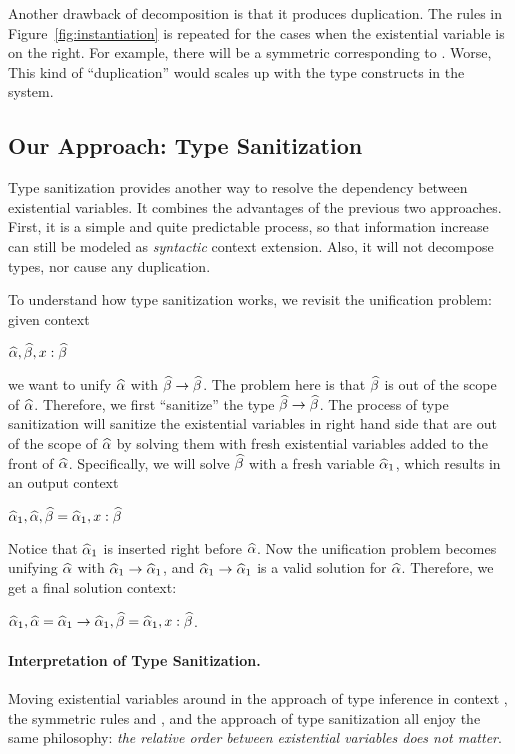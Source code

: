 Another drawback of decomposition is that it produces duplication. The rules in
Figure~\ref{fig:instantiation} is repeated for the cases when the existential
variable is on the right. For example, there will be a symmetric 
corresponding to . Worse, This kind of ``duplication'' would
scales up with the type constructs in the system.

\subsection{Our Approach: Type Sanitization}
\label{subsec:sanitization}

Type sanitization provides another way to resolve the dependency between existential
variables. It combines the advantages of the previous two approaches. First, it is a
simple and quite predictable process, so that information increase can still be
modeled as \textit{syntactic} context extension. Also, it will not decompose
types, nor cause any duplication.

To understand how type sanitization works, we revisit the unification
problem: given context

$\widehat{\alpha}, \widehat{\beta}, x: \widehat{\beta}$

\noindent we want to unify $\widehat{\alpha}$ with $\widehat{\beta} \to \widehat{\beta}$. The problem here is
that $\widehat{\beta}$ is out of the scope of $\widehat{\alpha}$. Therefore, we first ``sanitize''
the type $\widehat{\beta} \to \widehat{\beta}$. The process of type sanitization will sanitize the
existential variables in right hand side that are out of the scope of $\widehat{\alpha}$ by
solving them with fresh existential variables added to the front of $\widehat{\alpha}$.
Specifically, we will solve
$\widehat{\beta}$ with a fresh variable $\widehat{\alpha}_1$, which results in an output context

$\widehat{\alpha}_1, \widehat{\alpha}, \widehat{\beta} = \widehat{\alpha}_1, x: \widehat{\beta}$

Notice that $\widehat{\alpha}_1$ is inserted right before $\widehat{\alpha}$. Now the unification
problem becomes unifying $\widehat{\alpha}$ with $\widehat{\alpha}_1 \to \widehat{\alpha}_1$, and $\widehat{\alpha}_1 \to
\widehat{\alpha}_1$ is a valid solution for $\widehat{\alpha}$. Therefore, we get a final solution
context:

$\widehat{\alpha}_1, \widehat{\alpha} = \widehat{\alpha}_1 \to \widehat{\alpha}_1, \widehat{\beta} = \widehat{\alpha}_1, x : \widehat{\beta}$.


\paragraph{Interpretation of Type Sanitization.}
Moving existential variables around in the approach of type inference in context
\citep{gundry2010type}, the symmetric rules  and
 \citep{dunfield2013complete}, and the approach of type
sanitization all enjoy the same philosophy: \textit{the relative order between
  existential variables does not matter}.

